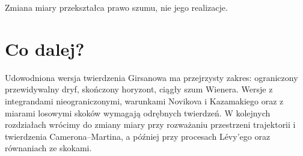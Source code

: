 \begin{center}
\par\smallskip\small Zmiana miary przekształca prawo szumu, nie jego realizacje.
\end{center}

\section{Co dalej?}
Udowodniona wersja twierdzenia Girsanowa ma przejrzysty
zakres: ograniczony przewidywalny dryf, skończony horyzont,
ciągły szum Wienera. Wersje z integrandami nieograniczonymi,
warunkami Novikova i Kazamakiego oraz z miarami losowymi
skoków wymagają odrębnych twierdzeń.
W kolejnych rozdziałach wrócimy do zmiany miary przy
rozważaniu przestrzeni trajektorii i twierdzenia
Camerona--Martina, a później przy procesach Lévy'ego
oraz równaniach ze skokami.

